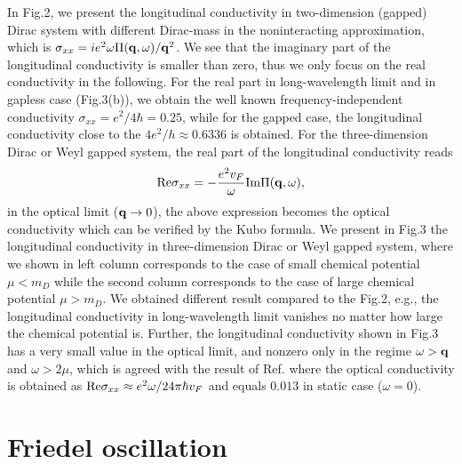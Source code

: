 \documentclass[UTF8,a4paper]{article}
\begin{document}
\begin{large}
In Fig.2, we present the longitudinal conductivity in two-dimension (gapped) Dirac system with different Dirac-mass in the noninteracting approximation,
which is $\sigma_{xx}=ie^{2}\omega\Pi({\bf q},\omega)/{\bf q}^{2}$.
We see that the imaginary part of the longitudinal conductivity is smaller than zero,
thus we only focus on the real conductivity in the following.
For the real part in long-wavelength limit and in gapless case (Fig.3(b)),
we obtain the well known frequency-independent conductivity $\sigma_{xx}=e^{2}/4\hbar=0.25$\cite{Ludwig A W W},
while for the gapped case, the longitudinal conductivity close to the $4e^{2}/h\approx 0.6336$ is obtained.
For the three-dimension Dirac or Weyl gapped system,
the real part of the longitudinal conductivity reads
\begin{equation} 
\begin{aligned}
{\rm Re}\sigma_{xx}=-\frac{e^{2}v_{F}}{\omega}{\rm Im}\Pi({\bf q},\omega),
\end{aligned}
\end{equation}
in the optical limit (${\bf q}\rightarrow 0$),
the above expression becomes the optical conductivity which can be verified by the Kubo formula\cite{Orlita M,Thakur A,Sodemann I}.
We present in Fig.3 the longitudinal conductivity in three-dimension Dirac or Weyl gapped system,
where we shown in left column corresponds to the case of small chemical potential $\mu<m_{D}$ while the second column corresponds to
the case of large chemical potential $\mu>m_{D}$.
We obtained different result compared to the Fig.2, e.g., the longitudinal conductivity in long-wavelength limit vanishes 
no matter how large the chemical potential is.
Further, the longitudinal conductivity shown in Fig.3 has a very small value in the optical limit,
and nonzero only in the regime $\omega>{\bf q}$ and $\omega>2\mu$,
which is agreed with the result of Ref.\cite{Thakur A}
where the optical conductivity is obtained as ${\rm Re}\sigma_{xx}\approx e^{2}\omega/24\pi\hbar v_{F}$
and equals $0.013$ in static case ($\omega=0$).

\section{Friedel oscillation}


\end{large}
\end{document}
